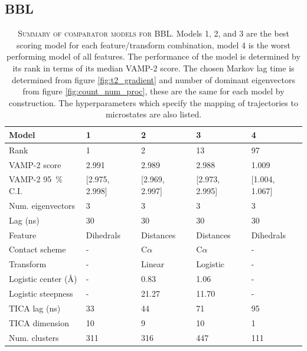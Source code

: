 \documentclass{article}
\begin{document}
\clearpage
\subsection{BBL}

\begin{table}[h]
    \centering
    \begin{tabular}{lllll}
    \toprule
    Model &               1 &               2 &               3 &               4 \\
    \midrule
    Rank                             &               1 &               2 &              13 &              97 \\
    VAMP-2 score                     &           2.991 &           2.989 &           2.988 &           1.009 \\
    VAMP-2 \SI{95}{\percent} C.I.    &  [2.975, 2.998] &  [2.969, 2.997] &  [2.973, 2.995] &  [1.004, 1.067] \\
    Num. eigenvectors                &               3 &               3 &               3 &               3 \\
    Lag (ns)                         &              30 &              30 &              30 &              30 \\
    Feature                          &       Dihedrals &       Distances &       Distances &       Dihedrals \\
    Contact scheme                   &               - &       C$\alpha$ &       C$\alpha$ &               - \\
    Transform                        &               - &          Linear &        Logistic &               - \\
    Logistic center (\si{\angstrom}) &               - &            0.83 &            1.06 &               - \\
    Logistic steepness               &               - &           21.27 &           11.70 &               - \\
    TICA lag (ns)                    &              33 &              44 &              71 &              95 \\
    TICA dimension                   &              10 &               9 &              10 &               1 \\
    Num. clusters                    &             311 &             316 &             447 &             111 \\
    \bottomrule
    \end{tabular}
    \caption{\textsc{Summary of comparator models for BBL.} Models 1, 2, and 3 are the best scoring model for each feature/transform combination, model 4 is the worst performing model of all features.  The performance of the model is determined by its rank in terms of its median VAMP-2 score.  The chosen Markov lag time is determined from figure \ref{fig:t2_gradient} and number of dominant eigenvectors from figure \ref{fig:count_num_proc}, these are the same for each model by construction. The hyperparameters which specify the mapping of trajectories to microstates are also listed.}
    \label{tab:2wav_mod_defs}
\end{table}
\end{document}
